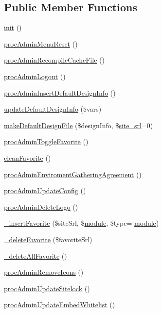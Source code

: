 \subsection*{Public Member Functions}
\begin{DoxyCompactItemize}
\item 
\hyperlink{classadminAdminController_abfceebf69c8870ad40dcb1714a6aae0e}{init} ()
\item 
\hyperlink{classadminAdminController_a0ba2a344a960ba3fa385f8450233cd32}{proc\+Admin\+Menu\+Reset} ()
\item 
\hyperlink{classadminAdminController_a15f6aab1393b491c9f754af46929fee7}{proc\+Admin\+Recompile\+Cache\+File} ()
\item 
\hyperlink{classadminAdminController_af49660a64f4b64c0b2f0801f4742abd1}{proc\+Admin\+Logout} ()
\item 
\hyperlink{classadminAdminController_ab0b62d09b5f73640ab9a7a7c5a58e579}{proc\+Admin\+Insert\+Default\+Design\+Info} ()
\item 
\hyperlink{classadminAdminController_ab0f984cd55d52455a818323404efb974}{update\+Default\+Design\+Info} (\$vars)
\item 
\hyperlink{classadminAdminController_a70c3ce620fc0791bb2acec0a9dedcc74}{make\+Default\+Design\+File} (\$design\+Info, \$\hyperlink{ko_8install_8php_a8b1406b4ad1048041558dce6bfe89004}{site\+\_\+srl}=0)
\item 
\hyperlink{classadminAdminController_ab7075e4e561ebf87b4d06418638d52ab}{proc\+Admin\+Toggle\+Favorite} ()
\item 
\hyperlink{classadminAdminController_a774b7d9260572f5d6391adc624e6b810}{clean\+Favorite} ()
\item 
\hyperlink{classadminAdminController_a8ef62179d5114d3d718846179d907bf0}{proc\+Admin\+Enviroment\+Gathering\+Agreement} ()
\item 
\hyperlink{classadminAdminController_a720735446257b930dce48d07c4ac9e4e}{proc\+Admin\+Update\+Config} ()
\item 
\hyperlink{classadminAdminController_a603a7e8aca1d391d61599b8db4ef2ccb}{proc\+Admin\+Delete\+Logo} ()
\item 
\hyperlink{classadminAdminController_a4d42a0954afb6d20d8f20617f8a5dac6}{\+\_\+insert\+Favorite} (\$site\+Srl, \$\hyperlink{classmodule}{module}, \$type= \textquotesingle{}\hyperlink{classmodule}{module}\textquotesingle{})
\item 
\hyperlink{classadminAdminController_aeaf185ff2307ca6fcccaf1589b25bc6f}{\+\_\+delete\+Favorite} (\$favorite\+Srl)
\item 
\hyperlink{classadminAdminController_af03754d231177ae0326f0cc262dd6dd7}{\+\_\+delete\+All\+Favorite} ()
\item 
\hyperlink{classadminAdminController_a9ddaddf87c06a8ef329ddc0d4305f5d1}{proc\+Admin\+Remove\+Icons} ()
\item 
\hyperlink{classadminAdminController_a4bbc5bf3f60f108c82b373b4b6fbf8a1}{proc\+Admin\+Update\+Sitelock} ()
\item 
\hyperlink{classadminAdminController_aff36b4021e19ccb44ab87043faf13b1a}{proc\+Admin\+Update\+Embed\+Whitelist} ()
\end{DoxyCompactItemize}

